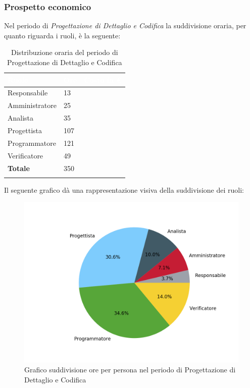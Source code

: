 \subsubsection{Prospetto economico}

Nel periodo di \textit{Progettazione di Dettaglio e Codifica} la suddivisione oraria, per quanto riguarda i ruoli, è la seguente: 

\begin{longtable}{| C{.30\textwidth}| C{.15\textwidth}| C{.20\textwidth}|}
	\hline
	\textbf{\textcolor{white}{Ruolo}} & \textbf{\textcolor{white}{Ore}} & \textbf{\textcolor{white}{Costo in \euro}} \\
	\hline 
	Responsabile & 13 &  \\
	\hline
	Amministratore & 25 & \\
	\hline
	Analista & 35 &  \\
	\hline
	Progettista & 107 &  \\
	\hline
	Programmatore & 121 &  \\
	\hline
	Verificatore & 49 &  \\
	\hline
	\textbf{Totale} & 350 & \\ 
	\hline
	
	\caption{Distribuzione oraria del periodo di Progettazione di Dettaglio e Codifica}
	\label{Distribuzione oraria dei ruoli pdc}
\end{longtable}

Il seguente grafico dà una rappresentazione visiva della suddivisione dei ruoli:
\begin{figure}[H]
	\centering
	\includegraphics[width=1\linewidth]{./images/torta_pdc.png}
	\caption{Grafico suddivisione ore per persona nel periodo di Progettazione di Dettaglio e Codifica}
	\label{fig:grafico suddivione ruoli periodo pdc}
\end{figure}

